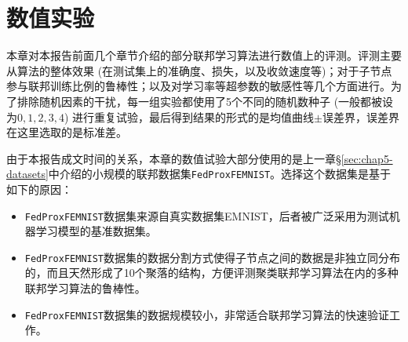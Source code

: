 \chapter{\texorpdfstring{\hspace{-1mm}\bf 数值实验}{数值实验}}
\label{chap6}


本章对本报告前面几个章节介绍的部分联邦学习算法进行数值上的评测。评测主要从算法的整体效果 (在测试集上的准确度、损失，以及收敛速度等)；对于子节点参与联邦训练比例的鲁棒性；以及对学习率等超参数的敏感性等几个方面进行。为了排除随机因素的干扰，每一组实验都使用了5个不同的随机数种子 (一般都被设为$0, 1, 2, 3, 4$) 进行重复试验，最后得到结果的形式的是均值曲线$\pm$误差界，误差界在这里选取的是标准差。

由于本报告成文时间的关系，本章的数值试验大部分使用的是上一章\S\ref{sec:chap5-datasets}中介绍的小规模的联邦数据集\texttt{FedProxFEMNIST}。选择这个数据集是基于如下的原因：
\begin{itemize}
    \item \texttt{FedProxFEMNIST}数据集来源自真实数据集EMNIST\cite{cohen2017emnist}，后者被广泛采用为测试机器学习模型的基准数据集。
    \item \texttt{FedProxFEMNIST}数据集的数据分割方式使得子节点之间的数据是非独立同分布的，而且天然形成了10个聚落的结构，方便评测聚类联邦学习算法\cite{Ghosh_2022_cfl, Sattler_2021_cfl}在内的多种联邦学习算法的鲁棒性。
    \item \texttt{FedProxFEMNIST}数据集的数据规模较小，非常适合联邦学习算法的快速验证工作。
\end{itemize}







